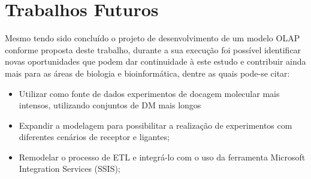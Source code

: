 \chapter{Trabalhos Futuros}
	Mesmo tendo sido concluído o projeto de desenvolvimento de um modelo OLAP conforme proposta deste trabalho, durante a sua execução foi possível identificar novas oportunidades que podem dar continuidade à este estudo e contribuir ainda mais para as áreas de biologia e bioinformática, dentre as quais pode-se citar:

\begin{itemize}
 	\item Utilizar como fonte de dados experimentos de docagem molecular mais intensos, utilizando conjuntos de DM mais longos
 	\item Expandir a modelagem para possibilitar a realização de experimentos com diferentes cenários de receptor e ligantes;
 	\item Remodelar o processo de ETL e integrá-lo com o uso da ferramenta Microsoft Integration Services (SSIS);
\end{itemize}

